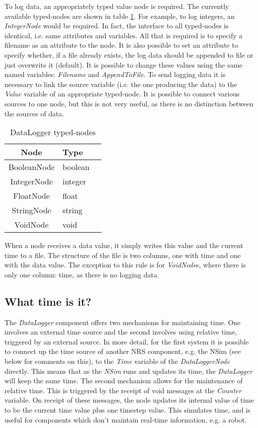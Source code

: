 \documentclass[10pt, notitlepage, a4paper]{article}
\begin{document}
To log data, an appropriately typed value node is required. The currently
available typed-nodes are shown in table \ref{logger_nodes}. For example, to
log integers, an {\it IntegerNode} would be required. In fact, the interface
to all typed-nodes is identical, i.e. same attributes and variables. All that is
required is to specify a filename as an attribute to the node. It is also
possible to set an attribute to specify whether, if a file already exists, the
log data should be appended to file or just overwrite it (default). It is 
possible to change these values using the same named variables: {\it Filename}
and {\it AppendToFile}. To send logging data it is necessary to link the source
variable (i.e. the one producing the data) to the {\it Value} variable of an
appropriate typed-node. It is possible to connect various sources to one node,
but this is not very useful, as there is no distinction between the sources of
data. 

\begin{table}[!ht]
\begin{center}
\label{logger_nodes}
\caption{DataLogger typed-nodes}
\begin{tabular}{|c|l|l|}
\hline Node & Type\\ \hline
\hline BooleanNode & boolean\\
\hline IntegerNode & integer\\
\hline FloatNode & float\\
\hline StringNode & string\\
\hline VoidNode & void\\
\hline
\end{tabular}
\end{center}
\end{table}

When a node receives a data value, it simply writes this value and the current
time to a file. The structure of the file is two columns, one with time and one
with the data value. The exception to this rule is for {\it VoidNode}s, where
there is only one column: time, as there is no logging data.

\subsection{What time is it?}
The {\it DataLogger} component offers two mechanisms for maintaining time. One
involves an external time source and the second involves using relative time,
triggered by an external source. In more detail, for the first system it is
possible to connect up the time source of another NRS component, e.g. the NSim
(see below for comments on this), to the {\it Time} variable of the {\it
  DataLoggerNode} directly. This means that as the {\it NSim} runs and updates
its time, the {\it DataLogger} will keep the same time. The second mechanism
allows for the maintenance of relative time. This is triggered by the receipt of
void messages at the {\it Counter} variable. On receipt of these messages, the
node updates its internal value of time to be the current time value plus one
timestep value. This simulates time, and is useful for components which don't
maintain real-time information, e.g. a robot.
\end{document}
